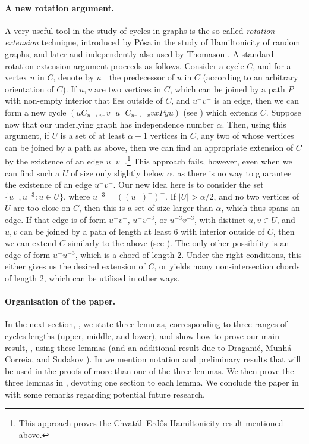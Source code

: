 \documentclass[11pt,english]{article}
\theoremstyle{plain}
\theoremstyle{definition}
\theoremstyle{remark}
\def \um {u^-}
\def \vm {v^-}
\def \mthree{^{-3}}
\def \nto {\leftarrow}
\begin{document}
	\paragraph{A new rotation argument.}
		A very useful tool in the study of cycles in graphs is the so-called \emph{rotation-extension} technique, introduced by P\'osa \cite{posa1976hamiltonian} in the study of Hamiltonicity of random graphs, and later and independently also used by Thomason \cite{thomason1978hamiltonian}.
		A standard rotation-extension argument proceeds as follows. Consider a cycle $C$, and for a vertex $u$ in $C$, denote by $\um$ the predecessor of $u$ in $C$ (according to an arbitrary orientation of $C$). If $u,v$ are two vertices in $C$, which can be joined by a path $P$ with non-empty interior that lies outside of $C$, and $\um \vm$ is an edge, then we can form a new cycle $(uC_{u \to \vm}\vm\um C_{\um \nto v}vxPyu)$ (see ) which extends $C$.
		Suppose now that our underlying graph has independence number $\alpha$.
		Then, using this argument, if $U$ is a set of at least $\alpha+1$ vertices in $C$, any two of whose vertices can be joined by a path as above, then we can find an appropriate extension of $C$ by the existence of an edge $\um \vm$.\footnote{This approach proves the Chvat\'al--Erd\H{o}s Hamiltonicity result mentioned above.}
		This approach fails, however, even when we can find such a $U$ of size only slightly below $\alpha$, as there is no way to guarantee the existence of an edge $\um \vm$. Our new idea here is to consider the set $\{\um, u\mthree : u \in U\}$, where $u\mthree = ((\um)^-)^-$. 
		If $|U| > \alpha/2$, and no two vertices of $U$ are too close on $C$, then this is a set of size larger than $\alpha$, which thus spans an edge. If that edge is of form $\um \vm$, $\um v\mthree$, or $u\mthree v\mthree$, with distinct $u,v \in U$, and $u,v$ can be joined by a path of length at least $6$ with interior outside of $C$, then we can extend $C$ similarly to the above (see ). The only other possibility is an edge of form $\um u\mthree$, which is a chord of length $2$. Under the right conditions, this either gives us the desired extension of $C$, or yields many non-intersection chords of length $2$, which can be utilised in other ways.

	\paragraph{Organisation of the paper.}
		In the next section, , we state three lemmas, corresponding to three ranges of cycles lengths (upper, middle, and lower), and show how to prove our main result, , using these lemmas (and an additional result due to Dragani\'c, Munh\'a-Correia, and Sudakov \cite{draganic2022pancyclicity}).
		In  we mention notation and preliminary results that will be used in the proofs of more than one of the three lemmas. We then prove the three lemmas in , devoting one section to each lemma.
		We conclude the paper in  with some remarks regarding potential future research.
\end{document}
